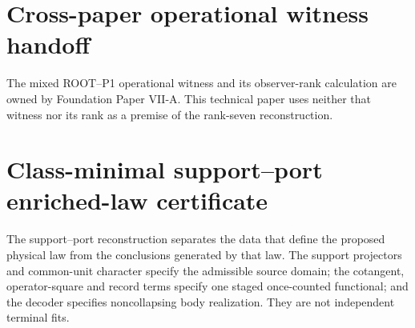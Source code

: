 \section{Cross-paper operational witness handoff}

The mixed ROOT--P1 operational witness and its observer-rank calculation are owned by Foundation Paper VII-A. This technical paper uses neither that witness nor its rank as a premise of the rank-seven reconstruction.

\section{Class-minimal support--port enriched-law certificate}
\label{app:p3minimalparentlaw}

The support--port reconstruction separates the data that define the proposed
physical law from the conclusions generated by that law.  The support
projectors and common-unit character specify the admissible source domain;
the cotangent, operator-square and record terms specify one staged
once-counted functional; and the decoder specifies noncollapsing body
realization.  They are not independent terminal fits.

